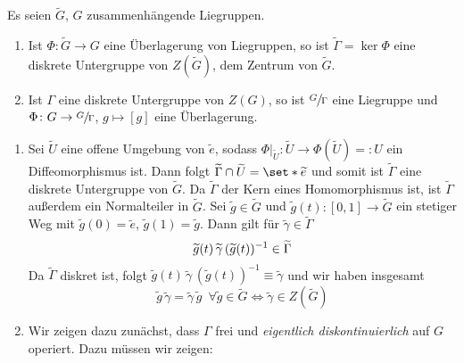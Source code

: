 \begin{korollar}[label=lem:133,{name=[{Kern einer Überlagerung ist diskrete Untergruppe des Zentrums}]}]
    Es seien $\widetilde{G}$, $G$ zusammenhängende Liegruppen. 
    \begin{enumerate}[1)]
        \item Ist $\Phi \colon \widetilde{G} \to G$ eine Überlagerung von Liegruppen, so ist $\widetilde{\Gamma} = \ker \Phi$ eine diskrete Untergruppe von $Z(\widetilde{G})$, dem Zentrum von $\widetilde{G}$.
        \item Ist $\Gamma$ eine diskrete Untergruppe von $Z(G)$, so ist $\sfrac{G}{\Gamma}$ eine Liegruppe und $\Phi \colon G \to \sfrac{G}{\Gamma}$, $g \mapsto [g]$ eine Überlagerung.
    \end{enumerate}
\end{korollar}
\begin{beweis}
    \begin{enumerate}[1)]
        \item Sei $\widetilde{U}$ eine offene Umgebung von $\widetilde{e}$, sodass $\Phi|_{\widetilde{U}} \colon \widetilde{U} \to \Phi(\widetilde{U}) =: U$ ein Diffeomorphismus ist.
        Dann folgt $\widetilde{\Gamma} \cap \widetilde{U} = \set*{\widetilde{e}}$ und somit ist $\widetilde{\Gamma}$ eine diskrete Untergruppe von $\widetilde{G}$.
        Da $\widetilde{\Gamma}$ der Kern eines Homomorphismus ist, ist $\widetilde{\Gamma}$ außerdem ein Normalteiler in $\widetilde{G}$.
        Sei $\widetilde{g} \in \widetilde{G}$ und $\widetilde{g}(t) \colon [0,1] \to \widetilde{G}$ ein stetiger Weg mit $\widetilde{g}(0)=\widetilde{e}$, $\widetilde{g}(1)=\widetilde{g}$.
        Dann gilt für $\widetilde{\gamma} \in \widetilde{\Gamma}$
        \[
            \widetilde{g}(t) \,\widetilde{\gamma} \,(\widetilde{g}(t))^{-1} \in \widetilde{\Gamma}
        \]
        Da $\widetilde{\Gamma}$ diskret ist, folgt $\widetilde{g}(t)\, \widetilde{\gamma}\, (\widetilde{g}(t))^{-1} \equiv \widetilde{\gamma}$ und wir haben insgesamt
        \[
            \widetilde{g} \, \widetilde{\gamma}=  \widetilde{\gamma}\, \widetilde{g} \enspace \forall \widetilde{g} \in \widetilde{G} \iff \widetilde{\gamma} \in Z(\widetilde{G})
        \]
        \item Wir zeigen dazu zunächst, dass $\Gamma$ frei und \emph{eigentlich diskontinuierlich} auf $G$ operiert.
		Dazu müssen wir zeigen:
		\begin{enumerate}[(i)]

\end{enumerate}
\end{enumerate}
\end{beweis}
